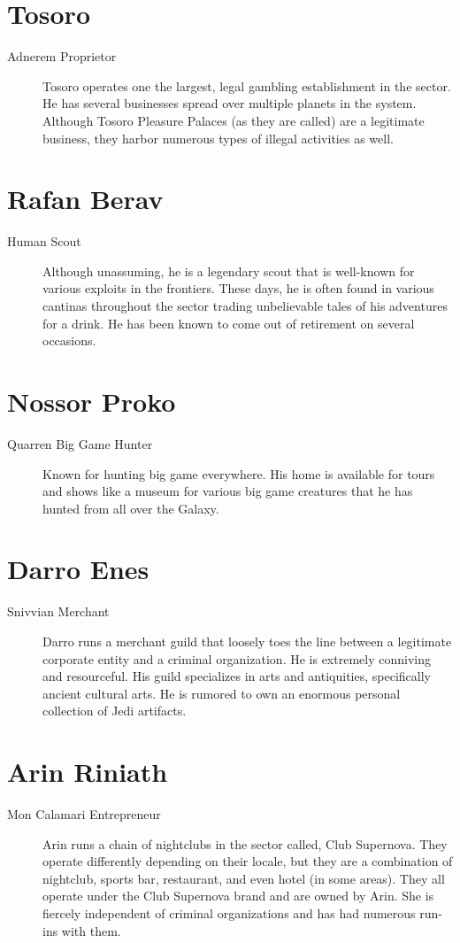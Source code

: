 \documentclass{article}
\begin{document}
\section{Tosoro}
\begin{description}
	\item [Adnerem \male Proprietor] Tosoro operates one the largest, legal gambling establishment in the sector. He has several businesses spread over multiple planets in the system. Although Tosoro Pleasure Palaces (as they are called) are a legitimate business, they harbor numerous types of illegal activities as well.
\end{description}
\section{Rafan Berav}
\begin{description}
	\item [Human \male Scout] Although unassuming, he is a legendary scout that is well-known for various exploits in the frontiers. These days, he is often found in various cantinas throughout the sector trading unbelievable tales of his adventures for a drink. He has been known to come out of retirement on several occasions.
\end{description}
\section{Nossor Proko}
\begin{description}
	\item [Quarren \male Big Game Hunter] Known for hunting big game everywhere. His home is available for tours and shows like a museum for various big game creatures that he has hunted from all over the Galaxy.
\end{description}
\section{Darro Enes}
\begin{description}
	\item [Snivvian \male Merchant] Darro runs a merchant guild that loosely toes the line between a legitimate corporate entity and a criminal organization. He is extremely conniving and resourceful. His guild specializes in arts and antiquities, specifically ancient cultural arts. He is rumored to own an enormous personal collection of Jedi artifacts.
\end{description}
\section{Arin Riniath}
\begin{description}
	\item [Mon Calamari \female Entrepreneur] Arin runs a chain of nightclubs in the sector called, Club Supernova. They operate differently depending on their locale, but they are a combination of nightclub, sports bar, restaurant, and even hotel (in some areas). They all operate under the Club Supernova brand and are owned by Arin. She is fiercely independent of criminal organizations and has had numerous run-ins with them.
\end{description}
\end{document}
